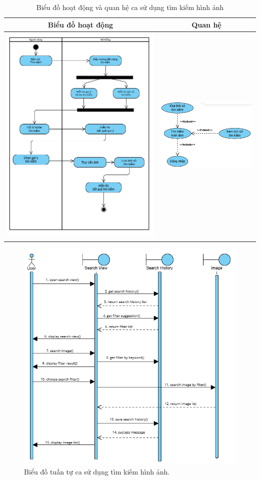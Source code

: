 \noindent 
\begin{table}[H]
\centering
\caption{Biểu đồ hoạt động và quan hệ ca sử dụng tìm kiếm hình ảnh}
\label{tab:search-image-usecase-activity}
\begin{tabular}{| c | c |}
    \hline
    \textbf{Biểu đồ hoạt động} & \textbf{Quan hệ} \\ 
    \hline
    \includegraphics[width=0.6\linewidth]{figures/c3/3-3-16-activity-diagram.png} 
    &  
    \includegraphics[width=0.35\linewidth]{figures/c3/3-3-16-relationship.png} \\ 
    \hline
\end{tabular}
\end{table}

\begin{figure}[H]
    \centering  
    \includegraphics[width=1.1\textwidth]{figures/c3/3-3-16-sequence-diagram.png}
    \caption{Biểu đồ tuần tự ca sử dụng tìm kiếm hình ảnh.}
    \label{fig:3-3-16-sequence-diagram}
\end{figure}